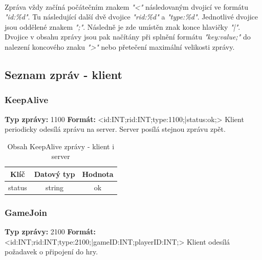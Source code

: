 \documentclass[12pt, a4paper]{article}
\begin{document}
\paragraph{}
Zpráva vždy začíná počátečním znakem \textit{"<"} následovaným dvojicí ve formátu \textit{"id:\%d"}. Tu následující
další dvě dvojice \textit{"rid:\%d"} a \textit{"type:\%d"}. Jednotlivé dvojice jsou oddělené znakem \textit{";"}.
Následně je zde umístěn znak konce hlavičky \textit{"|"}. Dvojice v obsahu zprávy jsou pak načítány při splnění
formátu \textit{"key:value;"} do nalezení koncového znaku \textit{">"} nebo přetečení maximální velikosti zprávy.


\newpage
\subsection{Seznam zpráv - klient}
\subsubsection{KeepAlive}
\textbf{Typ zprávy: } 1100 \newline
\textbf{Formát: } \newline  <id:INT;rid:INT;type:1100;|status:ok;> \newline
Klient periodicky odesílá zprávu na server. Server posílá stejnou zprávu zpět. \newline

    \begin{table}[H]
        \centering
        \begin{tabular}{|c|c|c|}
            \hline
            Klíč & Datový typ & Hodnota \\
            \hline
            \hline
            status & string & ok \\
            \hline
        \end{tabular}
        \caption{Obsah KeepAlive zprávy - klient i server}
    \end{table}

\subsubsection{GameJoin}
\textbf{Typ zprávy: } 2100 \newline
\textbf{Formát: } \newline  <id:INT;rid:INT;type:2100;|gameID:INT;playerID:INT;> \newline
Klient odesílá požadavek o připojení do hry. \newline
\end{document}
